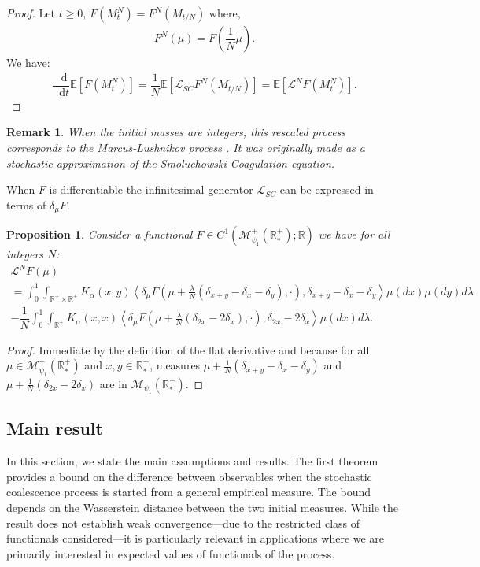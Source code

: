 \documentclass[11pt,a4paper]{article}
\newcommand{\RR}{\mathbb{R}}
\newcommand{\RRP}{\mathbb{R}^+_*}
\newcommand{\MC}{\mathcal{M}}
\newcommand{\LC}{\mathcal{L}}
\newcommand{\E}[1]{\mathbb{E}\left[#1\right]}
\newcommand{\dd}{\mathop{}\!\mathrm{d}}
\newtheorem{remark}[theorem]{Remark}
\newtheorem{proposition}[theorem]{Proposition}
\begin{document}
\begin{proof}
    Let $t \geq 0$, $F(M^N_t) = F^N(M_{t/N})$ where,
    \begin{align*}
        F^N(\mu) = F\left(\dfrac{1}{N}\mu\right).
    \end{align*}
    We have:
    \begin{align*}
        \dfrac{\dd}{\dd t}\E{F(M^N_t)}  = \dfrac{1}{N}\E{\LC_{SC} F^N\left(M_{t/N}\right)} =  \E{\LC^N F(M^N_t)}.
    \end{align*}
\end{proof}

\begin{remark}
   When the initial masses are integers, this rescaled process corresponds to the Marcus-Lushnikov process \cite{marcus1968stochastic,lushnikov1978coagulation}. It was originally made as a stochastic approximation of the Smoluchowski Coagulation equation.
\end{remark}
When $F$ is differentiable the infinitesimal generator $\LC_{SC}$ can be expressed in terms of $\delta_\mu F$.
\begin{proposition}\label{prop:SC_gen_differentiable}
    Consider a functional $F \in C^1(\MC_{\psi_1}^+\left(\RRP \right);\RR)$ we have for all integers $N$:
    \begin{multline*}
        \LC^N F(\mu)\\
         = \int_0^1 \int_{\RR^+ \times \RR^+} K_{\alpha}(x,y)\left\langle  \delta_\mu F\left(\mu + \frac{\lambda}{N}\left(\delta_{x + y} - \delta_x - \delta_y \right),\cdot\right),\delta_{x+y} - \delta_x - \delta_y\right\rangle\mu(dx)\mu(dy)d\lambda \\
        -\dfrac{1}{N}\int_0^1\int_{\RR^+} K_{\alpha}(x,x)\left\langle  \delta_\mu F\left(\mu + \frac{\lambda}{N}\left(\delta_{2x} - 2\delta_x \right),\cdot\right),\delta_{2x} - 2\delta_x \right\rangle\mu(dx)d\lambda.
    \end{multline*}
\end{proposition}
\begin{proof}
    Immediate by the definition of the flat derivative and because for all $\mu \in \MC_{\psi_1}^+\left(\RRP \right)$ and $x,y \in \RRP$, measures $\mu + \frac{1}{N}\left(\delta_{x + y} - \delta_x - \delta_y\right)$ and $\mu + \frac{1}{N}\left(\delta_{2x} - 2\delta_x \right)$ are in $\MC_{\psi_1}\left(\RRP \right)$.
\end{proof}

\subsection{Main result}
In this section, we state the main assumptions and results. The first theorem provides a bound on the difference between observables when the stochastic coalescence process is started from a general empirical measure. The bound depends on the Wasserstein distance between the two initial measures. While the result does not establish weak convergence—due to the restricted class of functionals considered—it is particularly relevant in applications where we are primarily interested in expected values of functionals of the process.
\end{document}
